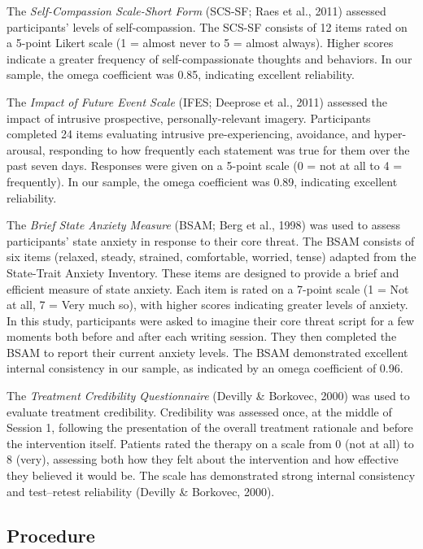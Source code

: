 \documentclass[
  man,floatsintext]{apa7}
\begin{document}
The \emph{Self-Compassion Scale-Short Form} (SCS-SF; Raes et al., 2011) assessed participants' levels of self-compassion.
The SCS-SF consists of 12 items rated on a 5-point Likert scale (1 = almost never to 5 = almost always).
Higher scores indicate a greater frequency of self-compassionate thoughts and behaviors.
In our sample, the omega coefficient was 0.85, indicating excellent reliability.

The \emph{Impact of Future Event Scale} (IFES; Deeprose et al., 2011) assessed the impact of intrusive prospective, personally-relevant imagery.
Participants completed 24 items evaluating intrusive pre-experiencing, avoidance, and hyper-arousal, responding to how frequently each statement was true for them over the past seven days.
Responses were given on a 5-point scale (0 = not at all to 4 = frequently).
In our sample, the omega coefficient was 0.89, indicating excellent reliability.

The \emph{Brief State Anxiety Measure} (BSAM; Berg et al., 1998) was used to assess participants' state anxiety in response to their core threat.
The BSAM consists of six items (relaxed, steady, strained, comfortable, worried, tense) adapted from the State-Trait Anxiety Inventory.
These items are designed to provide a brief and efficient measure of state anxiety.
Each item is rated on a 7-point scale (1 = Not at all, 7 = Very much so), with higher scores indicating greater levels of anxiety.
In this study, participants were asked to imagine their core threat script for a few moments both before and after each writing session.
They then completed the BSAM to report their current anxiety levels.
The BSAM demonstrated excellent internal consistency in our sample, as indicated by an omega coefficient of 0.96.

The \emph{Treatment Credibility Questionnaire} (Devilly \& Borkovec, 2000) was used to evaluate treatment credibility.
Credibility was assessed once, at the middle of Session 1, following the presentation of the overall treatment rationale and before the intervention itself.
Patients rated the therapy on a scale from 0 (not at all) to 8 (very), assessing both how they felt about the intervention and how effective they believed it would be.
The scale has demonstrated strong internal consistency and test--retest reliability (Devilly \& Borkovec, 2000).

\subsection{Procedure}\label{procedure}
\end{document}
